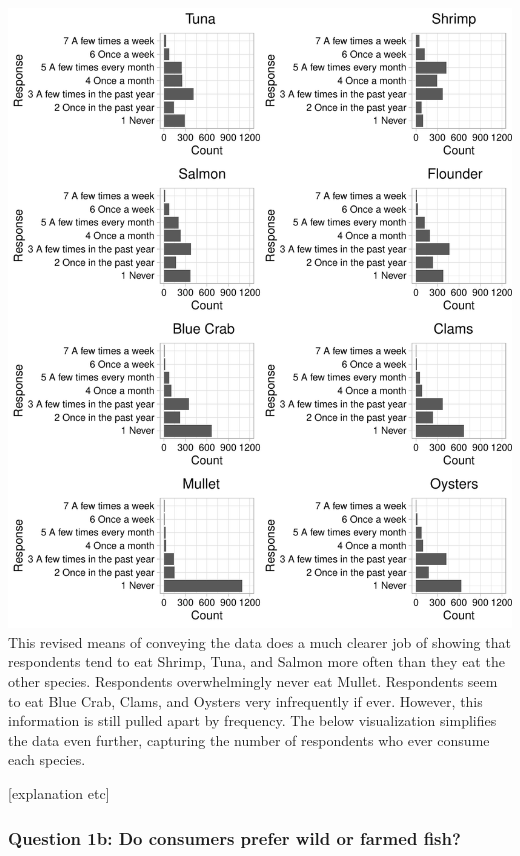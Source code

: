 \documentclass[
  12pt,
]{article}
\begin{document}
\includegraphics{Final_rmd_files/figure-latex/frequency-1.pdf} This
revised means of conveying the data does a much clearer job of showing
that respondents tend to eat Shrimp, Tuna, and Salmon more often than
they eat the other species. Respondents overwhelmingly never eat Mullet.
Respondents seem to eat Blue Crab, Clams, and Oysters very infrequently
if ever. However, this information is still pulled apart by frequency.
The below visualization simplifies the data even further, capturing the
number of respondents who ever consume each species.

{[}explanation etc{]}

\hypertarget{question-1b-do-consumers-prefer-wild-or-farmed-fish}{%
\subsubsection{Question 1b: Do consumers prefer wild or farmed
fish?}\label{question-1b-do-consumers-prefer-wild-or-farmed-fish}}
\end{document}
